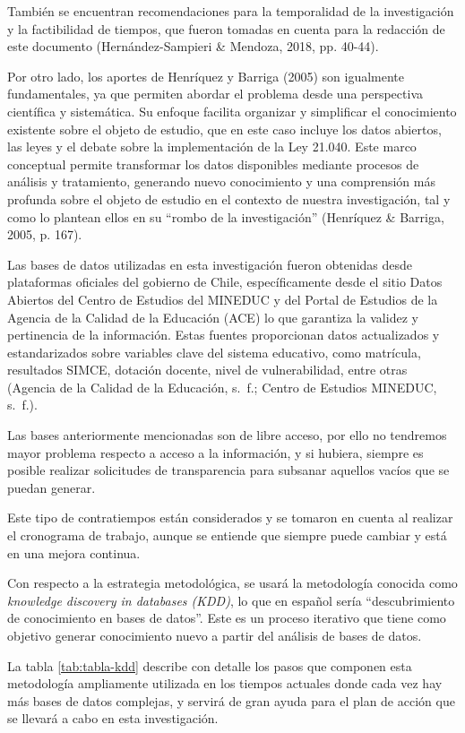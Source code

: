 \documentclass[
  12pt,
  letterpaper,
]{article}
\begin{document}
También se encuentran recomendaciones para la temporalidad de la investigación y la factibilidad de tiempos, que fueron tomadas en cuenta para la redacción de este documento (Hernández-Sampieri \& Mendoza, 2018, pp. 40-44).

Por otro lado, los aportes de Henríquez y Barriga (2005) son igualmente fundamentales, ya que permiten abordar el problema desde una perspectiva científica y sistemática.
Su enfoque facilita organizar y simplificar el conocimiento existente sobre el objeto de estudio, que en este caso incluye los datos abiertos, las leyes y el debate sobre la implementación de la Ley 21.040.
Este marco conceptual permite transformar los datos disponibles mediante procesos de análisis y tratamiento, generando nuevo conocimiento y una comprensión más profunda sobre el objeto de estudio en el contexto de nuestra investigación, tal y como lo plantean ellos en su ``rombo de la investigación'' (Henríquez \& Barriga, 2005, p. 167).

Las bases de datos utilizadas en esta investigación fueron obtenidas desde plataformas oficiales del gobierno de Chile, específicamente desde el sitio Datos Abiertos del Centro de Estudios del MINEDUC y del Portal de Estudios de la Agencia de la Calidad de la Educación (ACE) lo que garantiza la validez y pertinencia de la información.
Estas fuentes proporcionan datos actualizados y estandarizados sobre variables clave del sistema educativo, como matrícula, resultados SIMCE, dotación docente, nivel de vulnerabilidad, entre otras (Agencia de la Calidad de la Educación, s.~f.; Centro de Estudios MINEDUC, s.~f.).

Las bases anteriormente mencionadas son de libre acceso, por ello no tendremos mayor problema respecto a acceso a la información, y si hubiera, siempre es posible realizar solicitudes de transparencia para subsanar aquellos vacíos que se puedan generar.

Este tipo de contratiempos están considerados y se tomaron en cuenta al realizar el cronograma de trabajo, aunque se entiende que siempre puede cambiar y está en una mejora continua.

Con respecto a la estrategia metodológica, se usará la metodología conocida como \emph{knowledge discovery in databases (KDD)}, lo que en español sería ``descubrimiento de conocimiento en bases de datos''.
Este es un proceso iterativo que tiene como objetivo generar conocimiento nuevo a partir del análisis de bases de datos.

La tabla \ref{tab:tabla-kdd} describe con detalle los pasos que componen esta metodología ampliamente utilizada en los tiempos actuales donde cada vez hay más bases de datos complejas, y servirá de gran ayuda para el plan de acción que se llevará a cabo en esta investigación.
\end{document}
